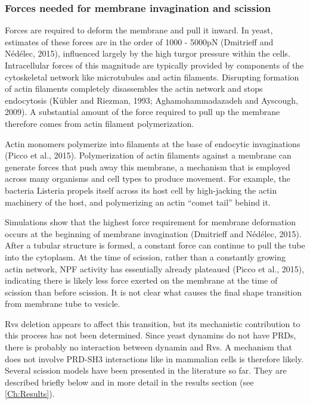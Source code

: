 \vspace{5mm}
		\subsubsection{Forces needed for membrane invagination and scission}
Forces are required to deform the membrane and pull it inward. In yeast, estimates of these forces are in the order of 1000 - 5000pN (Dmitrieff and Nédélec, 2015), influenced largely by the high turgor pressure within the cells. Intracellular forces of this magnitude are typically provided by components of the cytoskeletal network like microtubules and actin filaments. Disrupting formation of actin filaments completely disassembles the actin network and stops endocytosis (Kübler and Riezman, 1993; Aghamohammadazadeh and Ayscough, 2009). A substantial amount of the force required to pull up the membrane therefore comes from actin filament polymerization.

\vspace{5mm}
Actin monomers polymerize into filaments at the base of endocytic invaginations (Picco et al., 2015). Polymerization of actin filaments against a membrane can generate forces that push away this membrane, a mechanism that is employed across many organisms and cell types to produce movement. For example, the bacteria Listeria propels itself across its host cell by high-jacking the actin machinery of the host, and polymerizing an actin “comet tail” behind it. 

\vspace{5mm}
Simulations show that the highest force requirement for membrane deformation occurs at the beginning of membrane invagination (Dmitrieff and Nédélec, 2015). After a tubular structure is formed, a constant force can continue to pull the tube into the cytoplasm. At the time of scission, rather than a constantly growing actin network, NPF activity has essentially already plateaued (Picco et al., 2015), indicating there is likely less force exerted on the membrane at the time of scission than before scission. It is not clear what causes the final shape transition from membrane tube to vesicle.  

\vspace{5mm}
Rvs deletion appears to affect this transition, but its mechanistic contribution to this process has not been determined. Since yeast dynamins do not have PRDs, there is probably no interaction between dynamin and Rvs. A mechanism that does not involve PRD-SH3 interactions like in mammalian cells is therefore likely. Several scission models have been presented in the literature so far. They are described briefly below and in more detail in the results section (see \ref{Ch:Results}). 


